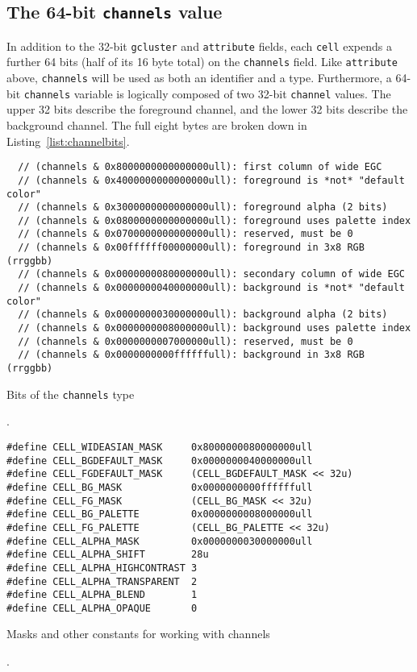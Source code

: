 \subsection{The 64-bit \texttt{channels} value}
\label{sec:channels}
In addition to the 32-bit \texttt{gcluster} and \texttt{attribute} fields, each
\texttt{cell} expends a further 64 bits (half of its 16 byte total) on the
\texttt{channels} field. Like \texttt{attribute} above, \texttt{channels} will
be used as both an identifier and a type. Furthermore, a 64-bit \texttt{channels}
variable is logically composed of two 32-bit \texttt{channel} values. The upper
32 bits describe the foreground channel, and the lower 32 bits describe the
background channel. The full eight bytes are broken down in Listing~\ref{list:channelbits}.

\begin{listing}[!htb]
\begin{verbatim}
  // (channels & 0x8000000000000000ull): first column of wide EGC
  // (channels & 0x4000000000000000ull): foreground is *not* "default color"
  // (channels & 0x3000000000000000ull): foreground alpha (2 bits)
  // (channels & 0x0800000000000000ull): foreground uses palette index
  // (channels & 0x0700000000000000ull): reserved, must be 0
  // (channels & 0x00ffffff00000000ull): foreground in 3x8 RGB (rrggbb)
  // (channels & 0x0000000080000000ull): secondary column of wide EGC
  // (channels & 0x0000000040000000ull): background is *not* "default color"
  // (channels & 0x0000000030000000ull): background alpha (2 bits)
  // (channels & 0x0000000008000000ull): background uses palette index
  // (channels & 0x0000000007000000ull): reserved, must be 0
  // (channels & 0x0000000000ffffffull): background in 3x8 RGB (rrggbb)
\end{verbatim}
\caption{Bits of the \texttt{channels} type}.
\label{list:channelbits}
\end{listing}

\begin{listing}[!htb]
\begin{verbatim}
#define CELL_WIDEASIAN_MASK     0x8000000080000000ull
#define CELL_BGDEFAULT_MASK     0x0000000040000000ull
#define CELL_FGDEFAULT_MASK     (CELL_BGDEFAULT_MASK << 32u)
#define CELL_BG_MASK            0x0000000000ffffffull
#define CELL_FG_MASK            (CELL_BG_MASK << 32u)
#define CELL_BG_PALETTE         0x0000000008000000ull
#define CELL_FG_PALETTE         (CELL_BG_PALETTE << 32u)
#define CELL_ALPHA_MASK         0x0000000030000000ull
#define CELL_ALPHA_SHIFT        28u
#define CELL_ALPHA_HIGHCONTRAST 3
#define CELL_ALPHA_TRANSPARENT  2
#define CELL_ALPHA_BLEND        1
#define CELL_ALPHA_OPAQUE       0
\end{verbatim}
\caption{Masks and other constants for working with channels}.
\label{list:channelconsts}
\end{listing}


